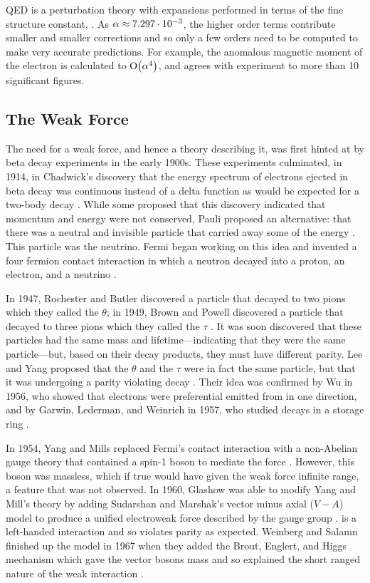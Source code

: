 QED is a perturbation theory with expansions performed in terms of the fine
structure constant, \fsc. As $\alpha \approx 7.297 \cdot 10^{-3}$, the higher
order terms contribute smaller and smaller corrections and so only a few orders
need to be computed to make very accurate predictions. For example, the
anomalous magnetic moment of the electron is calculated to $\operatorname{O}\!\left( \alpha^{4} \right)$,
and agrees with experiment to more than \num{10} significant figures.

\subsection{The Weak Force}
\label{subsection:weak_force}

The need for a weak force, and hence a theory describing it, was first hinted
at by beta decay experiments in the early 1900s. These experiments culminated,
in 1914, in Chadwick's discovery that the energy spectrum of electrons ejected
in beta decay was continuous instead of a delta function as would be expected
for a two-body decay \cite{chadwick1914}. While some proposed that this
discovery indicated that momentum and energy were not conserved, Pauli proposed
an alternative: that there was a neutral and invisible particle that carried
away some of the energy \cite{pauli1930}. This particle was the neutrino. Fermi
began working on this idea and invented a four fermion contact interaction in
which a neutron decayed into a proton, an electron, and a neutrino
\cite{fermi1934}.

In 1947, Rochester and Butler discovered a particle that decayed to two pions
which they called the $\theta$; in 1949, Brown and Powell discovered a particle
that decayed to three pions which they called the $\tau$
\cite{Rochester1947}\cite{brown1949}. It was soon discovered that these
particles had the same mass and lifetime---indicating that they were the same
particle---but, based on their decay products, they must have different parity.
Lee and Yang proposed that the $\theta$ and the $\tau$ were in fact the same
particle, but that it was undergoing a parity violating decay \cite{lee1956}.
Their idea was confirmed by Wu in 1956, who showed that electrons were
preferential emitted from \cobaltsixty in one direction, and by Garwin,
Lederman, and Weinrich in 1957, who studied \pitomunu decays in a storage ring
\cite{wu1956}\cite{garwin1957}.

In 1954, Yang and Mills replaced Fermi's contact interaction with a non-Abelian
gauge theory that contained a spin-1 boson to mediate the force
\cite{yang1954}. However, this boson was massless, which if true would have
given the weak force infinite range, a feature that was not observed. In 1960,
Glashow was able to modify Yang and Mill's theory by adding Sudarshan and
Marshak's vector minus axial ($V-A$) model to produce a unified electroweak
force described by the \SUtwoUone gauge group
\cite{glashow1961}\cite{sudarshan1958}. \SUtwo is a left-handed interaction and
so violates parity as expected. Weinberg and Salamn finished up the model in
1967 when they added the Brout, Englert, and Higgs mechanism which gave the
vector bosons mass and so explained the short ranged nature of the weak
interaction
\cite{weinberg1967}\cite{salam1968}\cite{englert1964}\cite{higgs1964}.

